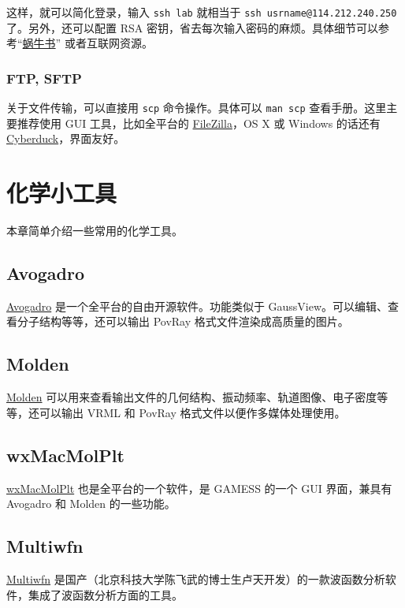 \documentclass[a4paper,openany]{book}
\newcommand{\chap}[1]{\newpage\thispagestyle{empty}\chapter{#1}\label{chap:\thechapter}}
\begin{document}
这样，就可以简化登录，输入 \texttt{ssh lab} 就相当于 \texttt{ssh usrname@114.212.240.250} 了。另外，还可以配置 RSA 密钥，省去每次输入密码的麻烦。具体细节可以参考“\href{http://www.amazon.cn/SSH-the-Secure-Shell-The-Definitive-Guide-Barrett-Daniel/dp/0596008953/ref=sr\_1\_5?s=books\&ie=UTF8\&qid=1389502024\&sr=1-5}{蜗牛书}” 或者互联网资源。

\subsection{FTP, SFTP}

关于文件传输，可以直接用 \texttt{scp} 命令操作。具体可以 \texttt{man scp} 查看手册。这里主要推荐使用 GUI 工具，比如全平台的 \href{https://filezilla-project.org}{FileZilla}，OS X 或 Windows 的话还有 \href{http://cyberduck.io}{Cyberduck}，界面友好。

\chap{化学小工具}

本章简单介绍一些常用的化学工具。

\section{Avogadro}

\href{http://avogadro.openmolecules.net/wiki/Main\_Page}{Avogadro} 是一个全平台的自由开源软件。功能类似于 GaussView。可以编辑、查看分子结构等等，还可以输出 PovRay 格式文件渲染成高质量的图片。

\section{Molden}

\href{http://www.cmbi.ru.nl/molden/}{Molden} 可以用来查看输出文件的几何结构、振动频率、轨道图像、电子密度等等，还可以输出 VRML 和 PovRay 格式文件以便作多媒体处理使用。

\section{wxMacMolPlt}

\href{https://code.google.com/p/wxmacmolplt/}{wxMacMolPlt} 也是全平台的一个软件，是 GAMESS 的一个 GUI 界面，兼具有 Avogadro 和 Molden 的一些功能。

\section{Multiwfn}

\href{http://multiwfn.codeplex.com}{Multiwfn} 是国产（北京科技大学陈飞武的博士生卢天开发）的一款波函数分析软件，集成了波函数分析方面的工具。
\end{document}
